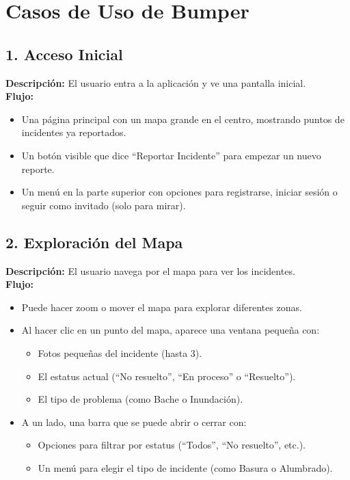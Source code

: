 \section{Casos de Uso de Bumper}


\subsection{1. Acceso Inicial}
\textbf{Descripción:} El usuario entra a la aplicación y ve una pantalla inicial.\\
\textbf{Flujo:}
\begin{itemize}
    \item Una página principal con un mapa grande en el centro, mostrando puntos de incidentes ya reportados.
    \item Un botón visible que dice ``Reportar Incidente'' para empezar un nuevo reporte.
    \item Un menú en la parte superior con opciones para registrarse, iniciar sesión o seguir como invitado (solo para mirar).
\end{itemize}

\subsection{2. Exploración del Mapa}
\textbf{Descripción:} El usuario navega por el mapa para ver los incidentes.\\
\textbf{Flujo:}
\begin{itemize}
    \item Puede hacer zoom o mover el mapa para explorar diferentes zonas.
    \item Al hacer clic en un punto del mapa, aparece una ventana pequeña con:
    \begin{itemize}
        \item Fotos pequeñas del incidente (hasta 3).
        \item El estatus actual (``No resuelto'', ``En proceso'' o ``Resuelto'').
        \item El tipo de problema (como Bache o Inundación).
    \end{itemize}
    \item A un lado, una barra que se puede abrir o cerrar con:
    \begin{itemize}
        \item Opciones para filtrar por estatus (``Todos'', ``No resuelto'', etc.).
        \item Un menú para elegir el tipo de incidente (como Basura o Alumbrado).
    \end{itemize}
\end{itemize}

